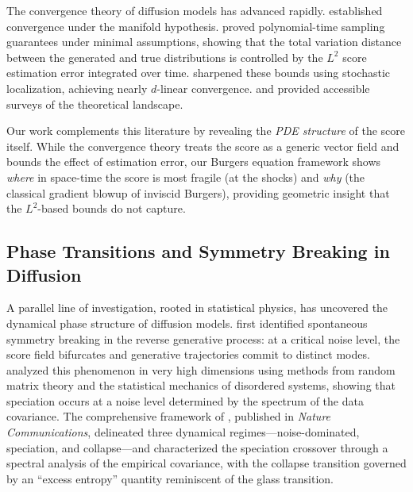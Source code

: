 \documentclass[11pt]{article}
\begin{document}
The convergence theory of diffusion models has advanced rapidly.
\citet{debortoli2022convergence} established convergence under the manifold hypothesis.
\citet{chen2023sampling} proved polynomial-time sampling guarantees under minimal assumptions, showing that the total variation distance between the generated and true distributions is controlled by the $L^2$ score estimation error integrated over time.
\citet{benton2024nearly} sharpened these bounds using stochastic localization, achieving nearly $d$-linear convergence.
\citet{lee2023convergence} and \citet{tang2024score} provided accessible surveys of the theoretical landscape.

Our work complements this literature by revealing the \emph{PDE structure} of the score itself.
While the convergence theory treats the score as a generic vector field and bounds the effect of estimation error, our Burgers equation framework shows \emph{where} in space-time the score is most fragile (at the shocks) and \emph{why} (the classical gradient blowup of inviscid Burgers), providing geometric insight that the $L^2$-based bounds do not capture.

\subsection{Phase Transitions and Symmetry Breaking in Diffusion}

A parallel line of investigation, rooted in statistical physics, has uncovered the dynamical phase structure of diffusion models.
\citet{raya2023spontaneous} first identified spontaneous symmetry breaking in the reverse generative process: at a critical noise level, the score field bifurcates and generative trajectories commit to distinct modes.
\citet{biroli2023generative} analyzed this phenomenon in very high dimensions using methods from random matrix theory and the statistical mechanics of disordered systems, showing that speciation occurs at a noise level determined by the spectrum of the data covariance.
The comprehensive framework of \citet{biroli2024dynamical}, published in \emph{Nature Communications}, delineated three dynamical regimes---noise-dominated, speciation, and collapse---and characterized the speciation crossover through a spectral analysis of the empirical covariance, with the collapse transition governed by an ``excess entropy'' quantity reminiscent of the glass transition.
\end{document}

